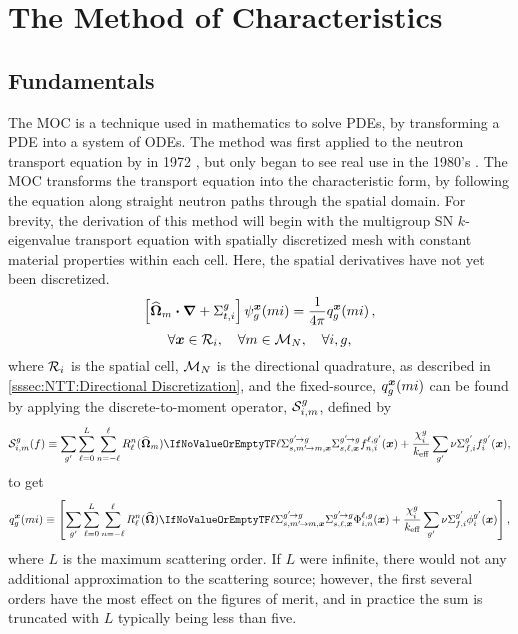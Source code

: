 \chapter{The Method of Characteristics}{\label{ch:The Method of Characteristics}
    
    
    
    \def\figpath{chapters/MOC/figures/}
    \graphicspath{ {\figpath} }

    \section{Fundamentals}{\label{sec:MOC:Fundamentals}
        The \acf{MOC} is a technique used in mathematics to solve \acp{PDE}, by transforming a \ac{PDE} into a system of \acp{ODE}.
        The method was first applied to the neutron transport equation by \citeauthor{Askew1972} in 1972 \cite{Askew1972}, but only began to see real use in the 1980's \cite{Halsall1980}.
        The \ac{MOC} transforms the transport equation into the characteristic form, by following the equation along straight neutron paths through the spatial domain.
        For brevity, the derivation of this method will begin with the multigroup \ac{SN} $k$-eigenvalue transport equation with spatially discretized mesh with constant material properties within each cell.
        Here, the spatial derivatives have not yet been discretized.
        \begin{equation}\label{eq:MOC:SSMGFS Transport}
            \left[\dirm\vdot\grad + \xst\right]\aflux[mi][g][\loc] = \rfourpi\source[mi][g][\loc],
        \end{equation}
        \begin{equation*}
            \forall\loc\in\Region, \quad \forall m \in \angquad, \quad \forall i, g,
        \end{equation*}
        where $\Region$ is the spatial cell, $\angquad$ is the directional quadrature, as described in \cref{sssec:NTT:Directional Discretization}, and the fixed-source, $
        \source[mi][g][\loc]$ can be found by applying the discrete-to-moment operator, $\FluxToSource$, defined by
        \begin{equation}\label{eq:MOC:LSA:Flux To Source Operator}
          \FluxToSource(f) \defined
            \suml[\gprime]\suml[\ell=0][L]\suml[n=-\ell][\ell]\SH[\ell][n][\dirm]\xss[\ell]f^{\ell,\gprime}_{n,i}(\loc)
            + \frac{\spect}{\keff}\suml[\gprime]\nufis f^{\gprime}_{i}(\loc),
        \end{equation}
        to get
        \begin{equation}\label{eq:MOC:Source}
            \source[mi][g][\loc] \defined
                \left[\suml[\gprime]\suml[\ell=0][L]\suml[n=-\ell][\ell]\SH\xss[\ell]\afluxmom(\loc) + \frac{\spect}{\keff}\suml[\gprime]\nufis\sflux[\gprime](\loc)\right],
        \end{equation}
        where $L$ is the maximum scattering order.
        If $L$ were infinite, there would not any additional approximation to the scattering source; however, the first several orders have the most effect on the figures of merit, and in practice the sum is truncated with $L$ typically being less than five.

}}
